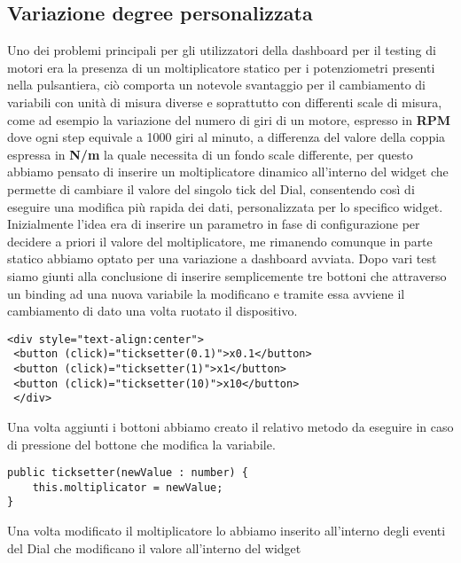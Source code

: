 \subsection{Variazione degree personalizzata}
Uno dei problemi principali per gli utilizzatori della dashboard per il testing di motori era la presenza di un moltiplicatore statico per i potenziometri presenti nella pulsantiera, ciò comporta un notevole svantaggio per il cambiamento di variabili con unità di misura diverse e  soprattutto con differenti scale di misura, come ad esempio la variazione del numero di giri di un motore, espresso in \textbf{RPM} dove ogni step equivale a 1000 giri al minuto, a differenza del valore della coppia espressa in \textbf{N/m} la quale necessita di un fondo scale differente, per questo abbiamo pensato di inserire un moltiplicatore dinamico all'interno del widget che permette di cambiare il valore del singolo tick del Dial, consentendo così di eseguire una modifica più rapida dei dati, personalizzata per lo specifico widget.
Inizialmente l'idea era di inserire un parametro in fase di configurazione per decidere a priori il valore del moltiplicatore, me rimanendo comunque in parte statico abbiamo optato per una variazione a dashboard avviata.
Dopo vari test siamo giunti alla conclusione di inserire semplicemente tre bottoni che attraverso un binding ad una nuova variabile la modificano e tramite essa avviene il cambiamento di dato una volta ruotato il dispositivo.
\vspace{1.0cm}
\begin{lstlisting}[caption={Aggiunta dei bottoni all'interno del file HTML del componente},style=javaScriptCode]
 <div style="text-align:center">
 <button (click)="ticksetter(0.1)">x0.1</button>
 <button (click)="ticksetter(1)">x1</button>
 <button (click)="ticksetter(10)">x10</button>
 </div>
\end{lstlisting} 
\vspace{1.0cm}
Una volta aggiunti i bottoni abbiamo creato il relativo metodo da eseguire in caso di pressione del bottone che modifica la variabile.
\vspace{0.5cm}
\begin{lstlisting}[caption={Modifica del moltiplicatore},style=javaScriptCode]
public ticksetter(newValue : number) {
    this.moltiplicator = newValue;
}
\end{lstlisting} 
\vspace{1.0cm}
Una volta modificato il moltiplicatore lo abbiamo inserito all'interno degli eventi del Dial che modificano il valore all'interno del widget

